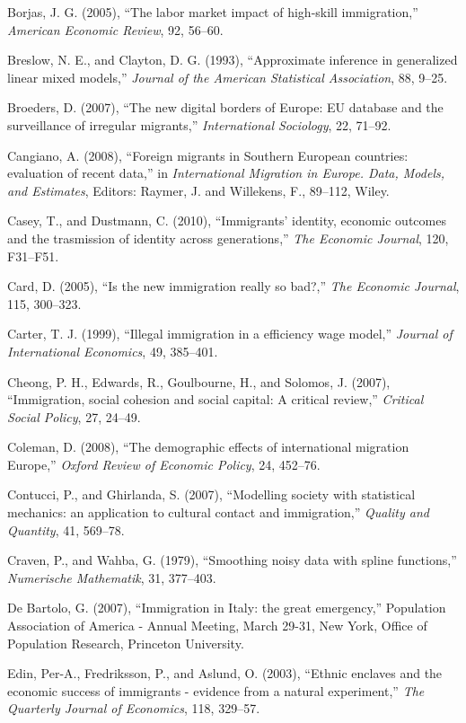 \documentclass[10pt] {article}
\theoremstyle{definition}
\theoremstyle{plain}
\begin{document}
\begin{thebibliography}{99}
\bibitem{} Borjas, J. G. (2005), ``The labor market impact of high-skill immigration,'' \textit{American Economic Review}, 92, 56--60.

\bibitem{} Breslow, N. E., and Clayton, D. G. (1993), ``Approximate inference in generalized linear mixed models,'' \textit{Journal of the American Statistical Association}, 88, 9--25.

\bibitem{} Broeders, D. (2007), ``The new digital borders of Europe: EU database and the surveillance of irregular migrants,'' \textit{International Sociology}, 22, 71--92.

\bibitem{} Cangiano, A. (2008), ``Foreign migrants in Southern European countries: evaluation of recent data,'' in \textit{International Migration in Europe. Data, Models, and Estimates}, Editors: Raymer, J. and Willekens, F., 89--112, Wiley.

\bibitem{} Casey, T., and Dustmann, C. (2010), ``Immigrants' identity, economic outcomes and the trasmission of identity across generations,'' \textit{The Economic Journal}, 120, F31--F51.

\bibitem{} Card, D. (2005), ``Is the new immigration really so bad?,'' \textit{The Economic Journal}, 115, 300--323.

\bibitem{} Carter, T. J. (1999), ``Illegal immigration in a efficiency wage model,'' \textit{Journal of International Economics}, 49, 385--401.

\bibitem{} Cheong, P. H., Edwards, R., Goulbourne, H., and Solomos, J. (2007), ``Immigration, social cohesion and social capital: A critical review,'' \textit{Critical Social Policy}, 27, 24--49.

\bibitem{} Coleman, D. (2008), ``The demographic effects of international migration Europe,'' \textit{Oxford Review of Economic Policy}, 24, 452--76.

\bibitem{} Contucci, P., and Ghirlanda, S. (2007), ``Modelling society with statistical mechanics: an application to cultural contact and immigration,'' \textit{Quality and Quantity}, 41, 569--78.

\bibitem{} Craven, P., and Wahba, G. (1979), ``Smoothing noisy data with spline functions,'' \textit{Numerische Mathematik}, 31, 377--403.

\bibitem{} De Bartolo, G. (2007), ``Immigration in Italy: the great emergency,'' Population Association of America - Annual Meeting, March 29-31, New York, Office of Population Research, Princeton University.

\bibitem{} Edin, Per-A., Fredriksson, P., and Aslund, O. (2003), ``Ethnic enclaves and the economic success of immigrants - evidence from a natural experiment,'' \textit{The Quarterly Journal of Economics}, 118, 329--57.


\end{thebibliography}
\end{document}
